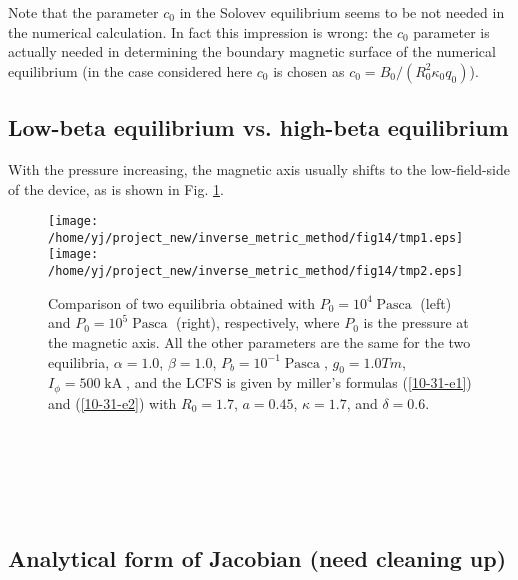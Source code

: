 \documentclass{article}
\newcommand{\tmop}[1]{\ensuremath{\operatorname{#1}}}
\begin{document}
Note that the parameter $c_0$ in the Solovev equilibrium seems to be not
needed in the numerical calculation. In fact this impression is wrong: the
$c_0$ parameter is actually needed in determining the boundary magnetic
surface of the numerical equilibrium (in the case considered here $c_0$ is
chosen as $c_0 = B_0 / (R_0^2 \kappa_0 q_0)$).

\subsection{Low-beta equilibrium vs. high-beta equilibrium}

With the pressure increasing, the magnetic axis usually shifts to the
low-field-side of the device, as is shown in Fig. \ref{10-31-e8}.

\begin{figure}[h]
  \texttt{[image: /home/yj/project\_new/inverse\_metric\_method/fig14/tmp1.eps]}\texttt{[image: /home/yj/project\_new/inverse\_metric\_method/fig14/tmp2.eps]}
  \caption{\label{10-31-e8}Comparison of two equilibria obtained with $P_0 =
  10^4 \tmop{Pasca}$ (left) and $P_0 = 10^5 \tmop{Pasca}$ (right),
  respectively, where $P_0$ is the pressure at the magnetic axis. All the
  other parameters are the same for the two equilibria, $\alpha = 1.0$, $\beta
  = 1.0$, $P_b = 10^{- 1} \tmop{Pasca}$, $g_0 = 1.0 T m$, $I_{\phi} = 500
  \tmop{kA}$, and the LCFS is given by miller's formulas (\ref{10-31-e1}) and
  (\ref{10-31-e2}) with $R_0 = 1.7$, $a = 0.45$, $\kappa = 1.7$, and $\delta =
  0.6$.}
\end{figure}

\

\

\

\subsection{Analytical form of Jacobian (need cleaning up)}
\end{document}
